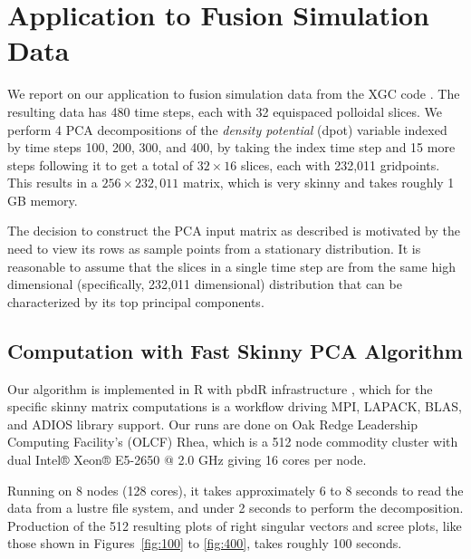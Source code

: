 \section{Application to Fusion Simulation Data}
\label{sec:xgc}
We report on our application to fusion simulation data from the XGC
code \cite{??}. The resulting data has 480 time steps, each with 32
equispaced polloidal slices. We perform 4 PCA decompositions of the
{\it density potential} (dpot) variable indexed by time steps 100,
200, 300, and 400, by taking the index time step and 15 more steps
following it to get a total of $32\times 16$ slices, each with 232,011
gridpoints. This results in a $256\times 232,011$ matrix, which is
very skinny and takes roughly 1 GB memory.

The decision to construct the PCA input matrix as described is
motivated by the need to view its rows as sample points from a
stationary distribution. It is reasonable to assume that the slices in
a single time step are from the same high dimensional (specifically,
232,011 dimensional) distribution that can be characterized by its top
principal components.

\subsection{Computation with Fast Skinny PCA Algorithm}
Our algorithm is implemented in R with pbdR infrastructure
\cite{Schmidt2017}, which for the specific skinny matrix computations
is a workflow driving MPI, LAPACK, BLAS, and ADIOS library
support. Our runs are done on Oak Redge Leadership Computing
Facility's (OLCF) Rhea, which is a 512 node commodity cluster with
dual Intel® Xeon® E5-2650 @ 2.0 GHz giving 16 cores per node.

Running on 8 nodes (128 cores), it takes
approximately 6 to 8 seconds to read the data from a lustre file
system, and under 2 seconds to perform the decomposition. Production
of the 512 resulting plots of right singular vectors and scree plots, like
those shown in Figures~\ref{fig:100} to \ref{fig:400}, takes roughly
100 seconds.

